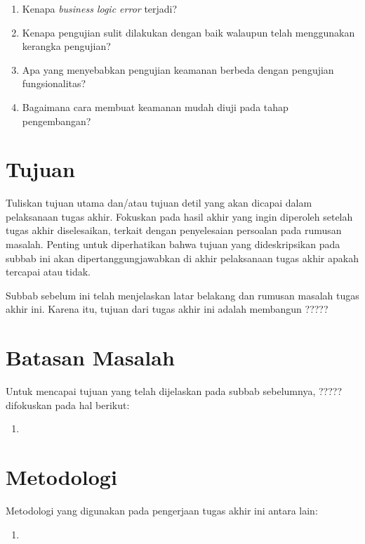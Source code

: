 \begin{enumerate}
    \item Kenapa \textit{business logic error} terjadi?
    \item Kenapa pengujian sulit dilakukan dengan baik walaupun telah menggunakan kerangka pengujian?
    \item Apa yang menyebabkan pengujian keamanan berbeda dengan pengujian fungsionalitas?
    \item Bagaimana cara membuat keamanan mudah diuji pada tahap pengembangan?
\end{enumerate}

\section{Tujuan}

Tuliskan tujuan utama dan/atau tujuan detil yang akan dicapai dalam pelaksanaan tugas akhir. Fokuskan pada hasil akhir yang ingin diperoleh setelah tugas akhir diselesaikan, terkait dengan penyelesaian persoalan pada rumusan masalah. Penting untuk diperhatikan bahwa tujuan yang dideskripsikan pada subbab ini akan dipertanggungjawabkan di akhir pelaksanaan tugas akhir apakah tercapai atau tidak.

Subbab sebelum ini telah menjelaskan latar belakang dan rumusan masalah tugas akhir ini.
Karena itu, tujuan dari tugas akhir ini adalah membangun ????? 

\section{Batasan Masalah}

Untuk mencapai tujuan yang telah dijelaskan pada subbab sebelumnya, ????? difokuskan pada hal berikut:

\begin{enumerate}
    \item 
\end{enumerate}

\section{Metodologi}

Metodologi yang digunakan pada pengerjaan tugas akhir ini antara lain:

\begin{enumerate}
    \item 
\end{enumerate}